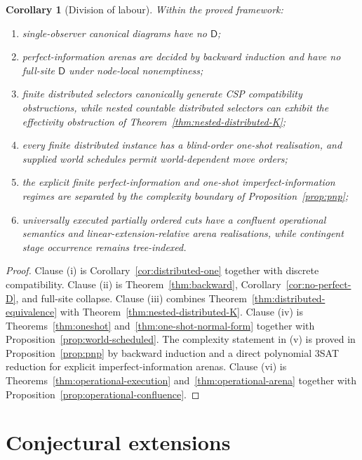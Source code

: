 \documentclass[11pt]{article}
\theoremstyle{plain}
\newtheorem{corollary}[theorem]{Corollary}
\theoremstyle{definition}
\theoremstyle{remark}
\begin{document}
\begin{corollary}[Division of labour]\label{cor:division}
Within the proved framework:
\begin{enumerate}[label=(\roman*)]
\item single-observer canonical diagrams have no $\mathsf D$;
\item perfect-information arenas are decided by backward induction and have no
full-site $\mathsf D$ under node-local nonemptiness;
\item finite distributed selectors canonically generate CSP compatibility
obstructions, while nested countable distributed selectors can exhibit the
effectivity obstruction of Theorem~\ref{thm:nested-distributed-K};
\item every finite distributed instance has a blind-order one-shot realisation,
and supplied world schedules permit world-dependent move orders;
\item the explicit finite perfect-information and one-shot imperfect-information
regimes are separated by the complexity boundary of Proposition~\ref{prop:pnp};
\item universally executed partially ordered cuts have a confluent operational
semantics and linear-extension-relative arena realisations, while contingent
stage occurrence remains tree-indexed.
\end{enumerate}
\end{corollary}


\begin{proof}
Clause (i) is Corollary~\ref{cor:distributed-one} together with discrete
compatibility. Clause (ii) is Theorem~\ref{thm:backward},
Corollary~\ref{cor:no-perfect-D}, and full-site collapse. Clause (iii) combines
Theorem~\ref{thm:distributed-equivalence} with
Theorem~\ref{thm:nested-distributed-K}. Clause (iv) is
Theorems~\ref{thm:oneshot} and~\ref{thm:one-shot-normal-form} together with
Proposition~\ref{prop:world-scheduled}. The complexity statement in (v) is
proved in Proposition~\ref{prop:pnp} by backward induction and a direct
polynomial 3SAT reduction for explicit imperfect-information arenas. Clause (vi) is
Theorems~\ref{thm:operational-execution} and~\ref{thm:operational-arena} together
with Proposition~\ref{prop:operational-confluence}.
\end{proof}

\section{Conjectural extensions}\label{sec:conjectures}
\end{document}
